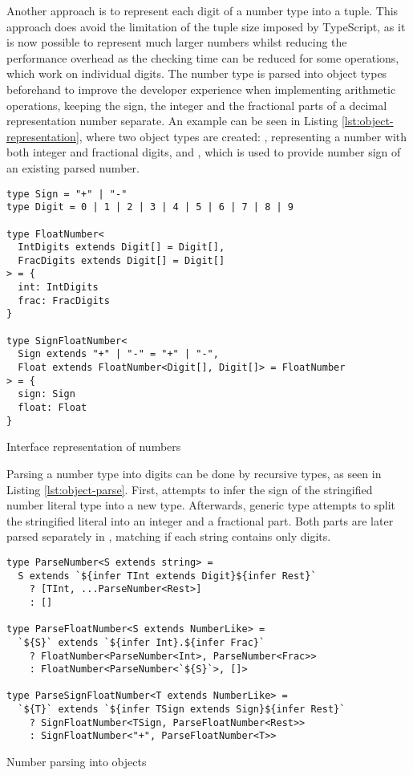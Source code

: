 Another approach is to represent each digit of a number type into a tuple. This approach does avoid the limitation of the tuple size imposed by TypeScript, as it is now possible to represent much larger numbers whilst reducing the performance overhead as the checking time can be reduced for some operations, which work on individual digits. The number type is parsed into object types beforehand to improve the developer experience when implementing arithmetic operations, keeping the sign, the integer and the fractional parts of a decimal representation number separate. An example can be seen in Listing \ref{lst:object-representation}, where two object types are created: , representing a number with both integer and fractional digits, and , which is used to provide number sign of an existing parsed number.

\begin{listing}[ht]
  \begin{verbatim}
type Sign = "+" | "-"
type Digit = 0 | 1 | 2 | 3 | 4 | 5 | 6 | 7 | 8 | 9

type FloatNumber<
  IntDigits extends Digit[] = Digit[],
  FracDigits extends Digit[] = Digit[]
> = {
  int: IntDigits
  frac: FracDigits
}

type SignFloatNumber<
  Sign extends "+" | "-" = "+" | "-",
  Float extends FloatNumber<Digit[], Digit[]> = FloatNumber
> = {
  sign: Sign
  float: Float
}
\end{verbatim}
  \caption{Interface representation of numbers}\label{lst:object-representation}
\end{listing}

Parsing a number type into digits can be done by recursive types, as seen in Listing \ref{lst:object-parse}. First,  attempts to infer the sign of the stringified number literal type into a new  type. Afterwards,  generic type attempts to split the stringified literal into an integer and a fractional part. Both parts are later parsed separately in , matching if each string contains only digits.

\begin{listing}[ht]
  \begin{verbatim}
type ParseNumber<S extends string> =
  S extends `${infer TInt extends Digit}${infer Rest}`
    ? [TInt, ...ParseNumber<Rest>]
    : []

type ParseFloatNumber<S extends NumberLike> =
  `${S}` extends `${infer Int}.${infer Frac}`
    ? FloatNumber<ParseNumber<Int>, ParseNumber<Frac>>
    : FloatNumber<ParseNumber<`${S}`>, []>

type ParseSignFloatNumber<T extends NumberLike> =
  `${T}` extends `${infer TSign extends Sign}${infer Rest}`
    ? SignFloatNumber<TSign, ParseFloatNumber<Rest>>
    : SignFloatNumber<"+", ParseFloatNumber<T>>
\end{verbatim}
  \caption{Number parsing into objects}\label{lst:object-parse}
\end{listing}

